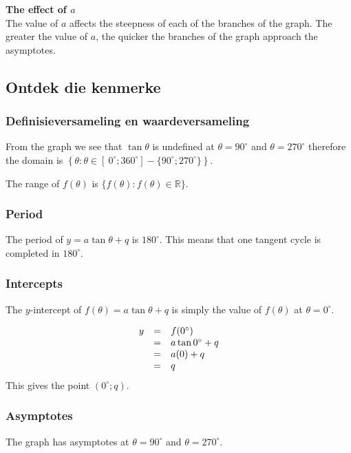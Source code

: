 \textbf{The effect of $a$}
\\
The value of $a$ affects the steepness of each of the branches of the graph. The greater the value of $a$, the quicker the branches of the graph approach the asymptotes.




\subsection*{Ontdek die kenmerke}
\subsubsection*{Definisieversameling en waardeversameling}
\nopagebreak
From the graph we see that $\tan\theta$ is undefined at
$\theta = 90^{\circ}$ and $\theta = 270^{\circ}$ therefore the domain is
$\left\{ \theta: \theta \in [~0^{\circ}; 360^{\circ}] - \{90^{\circ}; 270^{\circ}\} \right\}$.

The range of $f(\theta)$ is $\{f(\theta): f(\theta) \in \mathbb{R}\}$.

\subsubsection*{Period}
The period of $y=a\tan\theta+q$ is $180^{\circ}$. This means that one tangent cycle is completed in $180^{\circ}$. 


\subsubsection*{Intercepts}
\nopagebreak
The $y$-intercept of $f(\theta)=a\tan\theta+q$ is simply the value of
$f(\theta)$ at $\theta = {0}^{\circ}$.

\begin{equation*}
\begin{array}{ccl}\hfill y& =& f({0}^{\circ })\hfill \\
 & =& a\tan {0}^{\circ } + q \hfill \\
 & =& a(0)+q\hfill \\
 & =& q\hfill 
\end{array}
\end{equation*}
This gives the point $(0^{\circ}; q)$.
\subsubsection*{Asymptotes}
\nopagebreak
The graph has asymptotes at $\theta ={90}^{\circ }$ and $\theta={270}^{\circ }$.

